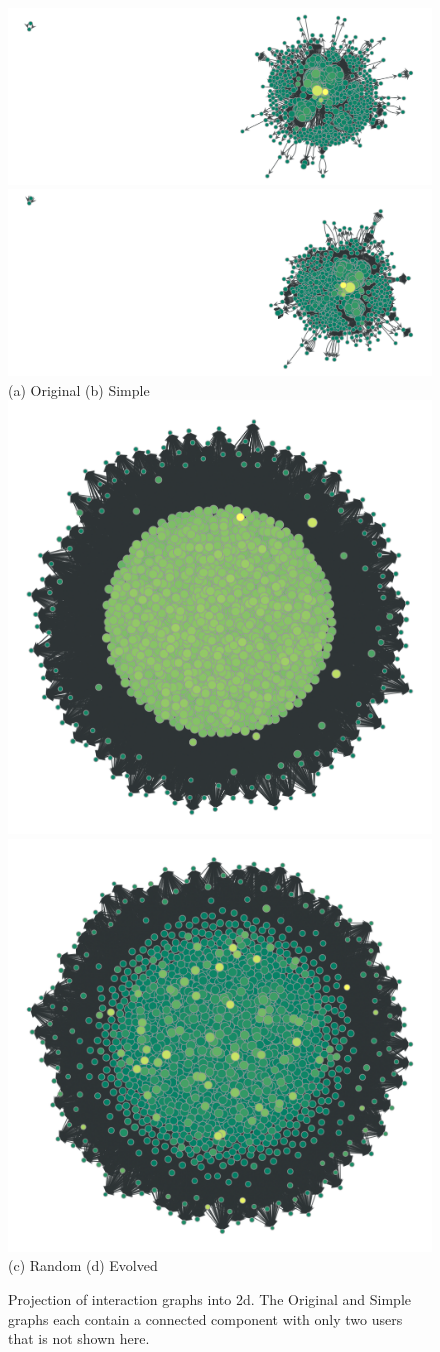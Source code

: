 \documentclass[dvipsnames,format=sigconf,anonymous=False,review=false, balance=false]{acmart}
\begin{document}
\begin{figure}
\centering\vspace{-2mm}%
\includegraphics[width=0.41\linewidth,trim=650 0 0 0,clip]{Original_network_1k.png} 
\includegraphics[width=0.395\linewidth,trim=720 0 0 20,clip]{Simple_network_1k.png}\\
(a) Original \hspace{20mm} (b) Simple \hspace{2mm}\;\\
\includegraphics[width=0.385\linewidth,trim=0 0 0 0,clip]{Random_network_1k.png}
\includegraphics[width=0.4\linewidth,trim=0 0 0 0,clip]{Evolved_network_1k.png}\\
(c) Random \hspace{19mm} (d) Evolved
\vspace{-1mm}\caption{Projection of interaction graphs into 2d. The Original and Simple graphs each contain a connected component with only two users that is not shown here.}
\label{fig:projection}
\end{figure}
\end{document}
